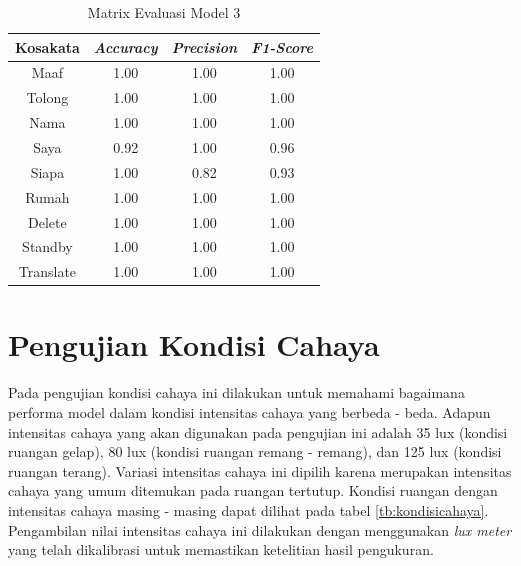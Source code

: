 \newpage
\begin{longtable}{|c|c|c|c|}
  \caption{Matrix Evaluasi Model 3}
  \label{tb:model3stat}                                   \\
  \hline
  \rowcolor[HTML]{C0C0C0}
  \textbf{Kosakata} & \textbf{\emph{Accuracy}} & \textbf{\emph{Precision}} & \textbf{\emph{F1-Score}} \\
  \hline
  Maaf              & 1.00                        & 1.00                   & 1.00                \\
  Tolong            & 1.00                        & 1.00                   & 1.00                \\
  Nama              & 1.00                        & 1.00                   & 1.00                \\
  Saya              & 0.92                        & 1.00                   & 0.96                \\
  Siapa             & 1.00                        & 0.82                   & 0.93                \\
  Rumah             & 1.00                        & 1.00                   & 1.00                \\
  Delete            & 1.00                        & 1.00                   & 1.00                \\
  Standby           & 1.00                        & 1.00                   & 1.00                \\
  Translate         & 1.00                        & 1.00                   & 1.00                \\
  \hline
\end{longtable}

\section{Pengujian Kondisi Cahaya}
\label{sec:analisiscahaya}

Pada pengujian kondisi cahaya ini dilakukan untuk memahami bagaimana performa model dalam kondisi intensitas cahaya  yang berbeda - beda. Adapun intensitas cahaya yang akan digunakan pada pengujian ini adalah 35 lux (kondisi ruangan gelap), 80 lux (kondisi ruangan remang - remang), dan 125 lux (kondisi ruangan terang). Variasi intensitas cahaya ini dipilih karena merupakan intensitas cahaya yang umum ditemukan pada ruangan tertutup. Kondisi ruangan dengan intensitas cahaya masing - masing dapat dilihat pada tabel \ref{tb:kondisicahaya}. Pengambilan nilai intensitas cahaya ini dilakukan dengan menggunakan \emph{lux meter} yang telah dikalibrasi untuk memastikan ketelitian hasil pengukuran.

